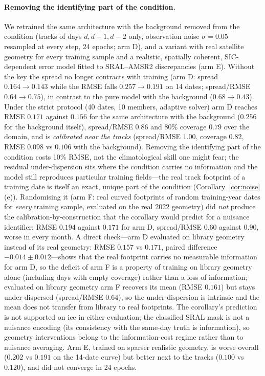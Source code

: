 \documentclass[11pt]{article}
\begin{document}
\paragraph{Removing the identifying part of the condition.} We retrained the same architecture with the background removed from the condition (tracks of days $d,d-1,d-2$ only, observation noise $\sigma=0.05$ resampled at every step, 24 epochs; arm D), and a variant with real satellite geometry for every training sample and a realistic, spatially coherent, SIC-dependent error model fitted to SRAL--AMSR2 discrepancies (arm E). Without the key the spread no longer contracts with training (arm D: spread $0.164\to0.143$ while the RMSE falls $0.257\to0.191$ on 14 dates; spread/RMSE $0.64\to0.75$), in contrast to the pure model with the background ($0.68\to0.43$). Under the strict protocol (40 dates, 10 members, adaptive solver) arm D reaches RMSE $0.171$ against $0.156$ for the same architecture with the background ($0.256$ for the background itself), spread/RMSE $0.86$ and 80\% coverage $0.79$ over the domain, and is \emph{calibrated near the tracks} (spread/RMSE $1.00$, coverage $0.82$, RMSE $0.098$ vs $0.106$ with the background). Removing the identifying part of the condition costs 10\% RMSE, not the climatological skill one might fear; the residual under-dispersion sits where the condition carries no information and the model still reproduces particular training fields---the real track footprint of a training date is itself an exact, unique part of the condition (Corollary~\ref{cor:noise}(e)). Randomising it (arm F: real curved footprints of random training-year dates for \emph{every} training sample, evaluated on the real 2022 geometry) did \emph{not} produce the calibration-by-construction that the corollary would predict for a nuisance identifier: RMSE $0.194$ against $0.171$ for arm D, spread/RMSE $0.60$ against $0.90$, worse in every month. A direct check---arm D evaluated on library geometry instead of its real geometry: RMSE $0.157$ vs $0.171$, paired difference $-0.014\pm0.012$---shows that the real footprint carries no measurable information for arm D, so the deficit of arm F is a property of training on library geometry alone (including days with empty coverage) rather than a loss of information; evaluated on library geometry arm F recovers its mean (RMSE $0.161$) but stays under-dispersed (spread/RMSE $0.64$), so the under-dispersion is intrinsic and the mean does not transfer from library to real footprints. The corollary's prediction is not supported on ice in either evaluation; the classified SRAL mask is not a nuisance encoding (its consistency with the same-day truth is information), so geometry interventions belong to the information-cost regime rather than to nuisance averaging. Arm E, trained on sparser realistic geometry, is worse overall ($0.202$ vs $0.191$ on the 14-date curve) but better next to the tracks ($0.100$ vs $0.120$), and did not converge in 24 epochs.
\end{document}
